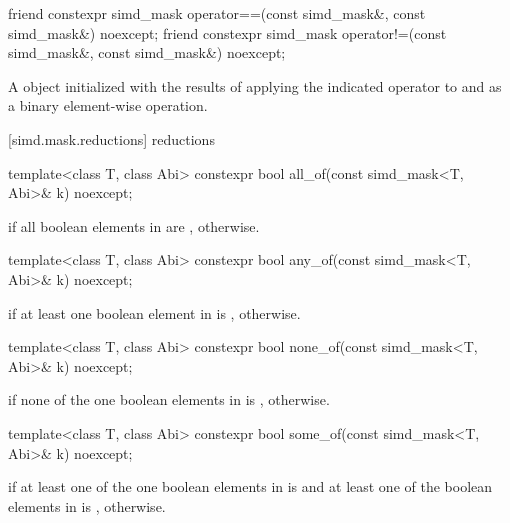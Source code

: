 \begin{itemdecl}
friend constexpr simd_mask operator==(const simd_mask&, const simd_mask&) noexcept;
friend constexpr simd_mask operator!=(const simd_mask&, const simd_mask&) noexcept;
\end{itemdecl}

\begin{itemdescr}
  \pnum\returns
  A  object initialized with the results of applying the indicated operator to  and  as a binary element-wise operation.
\end{itemdescr}

[simd.mask.reductions]{\texorpdfstring{ reductions}{simd_mask reductions}}

\begin{itemdecl}
template<class T, class Abi> constexpr bool all_of(const simd_mask<T, Abi>& k) noexcept;
\end{itemdecl}

\begin{itemdescr}
  \pnum\returns
   if all boolean elements in  are ,  otherwise.
\end{itemdescr}

\begin{itemdecl}
template<class T, class Abi> constexpr bool any_of(const simd_mask<T, Abi>& k) noexcept;
\end{itemdecl}

\begin{itemdescr}
  \pnum\returns
   if at least one boolean element in  is ,  otherwise.
\end{itemdescr}

\begin{itemdecl}
template<class T, class Abi> constexpr bool none_of(const simd_mask<T, Abi>& k) noexcept;
\end{itemdecl}

\begin{itemdescr}
  \pnum\returns
   if none of the one boolean elements in  is ,  otherwise.
\end{itemdescr}

\begin{itemdecl}
template<class T, class Abi> constexpr bool some_of(const simd_mask<T, Abi>& k) noexcept;
\end{itemdecl}

\begin{itemdescr}
  \pnum\returns
   if at least one of the one boolean elements in  is  and at least one of the boolean elements in  is ,  otherwise.
\end{itemdescr}

